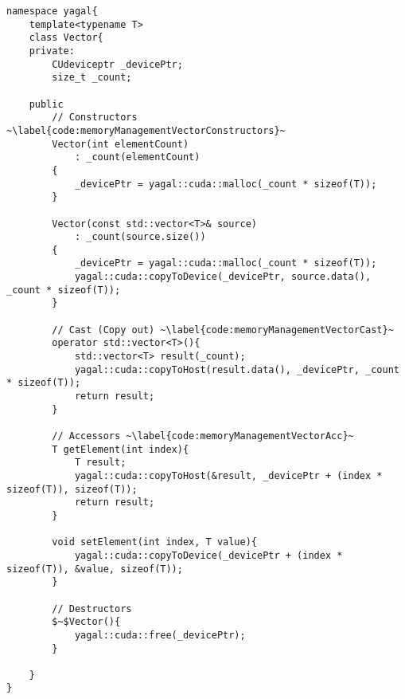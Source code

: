 

\begin{lstlisting}[caption={Vector class, showing only code relevant to memory management.}, label={code:memoryManagementVector}, mathescape]
namespace yagal{
    template<typename T>
    class Vector{
    private:
        CUdeviceptr _devicePtr;
        size_t _count;

    public
        // Constructors ~\label{code:memoryManagementVectorConstructors}~
        Vector(int elementCount)
            : _count(elementCount)
        {
            _devicePtr = yagal::cuda::malloc(_count * sizeof(T));
        }

        Vector(const std::vector<T>& source)
            : _count(source.size())
        {
            _devicePtr = yagal::cuda::malloc(_count * sizeof(T));
            yagal::cuda::copyToDevice(_devicePtr, source.data(), _count * sizeof(T));
        }

        // Cast (Copy out) ~\label{code:memoryManagementVectorCast}~
        operator std::vector<T>(){
            std::vector<T> result(_count);
            yagal::cuda::copyToHost(result.data(), _devicePtr, _count * sizeof(T));
            return result;
        }

        // Accessors ~\label{code:memoryManagementVectorAcc}~
        T getElement(int index){
            T result;
            yagal::cuda::copyToHost(&result, _devicePtr + (index * sizeof(T)), sizeof(T));
            return result;
        }

        void setElement(int index, T value){
            yagal::cuda::copyToDevice(_devicePtr + (index * sizeof(T)), &value, sizeof(T));
        }

        // Destructors
        $~$Vector(){
            yagal::cuda::free(_devicePtr);
        }

    }
}
\end{lstlisting}

